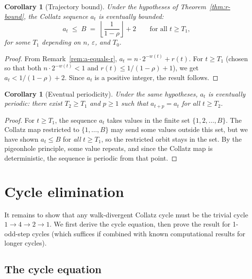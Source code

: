 \documentclass[11pt,a4paper]{article}
\theoremstyle{plain}
\newtheorem{corollary}[theorem]{Corollary}
\theoremstyle{definition}
\begin{document}
\begin{corollary}[Trajectory bound]\label{cor:bounded}
Under the hypotheses of Theorem~\ref{thm:r-bound}, the Collatz
sequence $a_t$ is eventually bounded:
\[
  a_t \;\le\; B \;=\; \left\lfloor \frac{1}{1-\rho} \right\rfloor + 2
  \qquad\text{for all } t \ge T_1,
\]
for some $T_1$ depending on $n$, $\varepsilon$, and $T_0$.
\end{corollary}

\begin{proof}
From Remark~\ref{rem:a-equals-r},
$a_t = n \cdot 2^{-w(t)} + r(t)$.  For $t \ge T_1$ (chosen so that
both $n \cdot 2^{-w(t)} < 1$ and $r(t) \le 1/(1-\rho) + 1$), we get
$a_t < 1/(1-\rho) + 2$.  Since $a_t$ is a positive integer, the
result follows.
\end{proof}

\begin{corollary}[Eventual periodicity]\label{cor:periodic}
Under the same hypotheses, $a_t$ is eventually periodic: there exist
$T_2 \ge T_1$ and $p \ge 1$ such that $a_{t+p} = a_t$ for all
$t \ge T_2$.
\end{corollary}

\begin{proof}
For $t \ge T_1$, the sequence $a_t$ takes values in the finite set
$\{1, 2, \ldots, B\}$.  The Collatz map restricted to $\{1, \ldots, B\}$
may send some values outside this set, but we have shown $a_t \le B$
for \emph{all} $t \ge T_1$, so the restricted orbit stays in the set.
By the pigeonhole principle, some value repeats, and since the Collatz
map is deterministic, the sequence is periodic from that point.
\end{proof}

\section{Cycle elimination}

It remains to show that any walk-divergent Collatz cycle must be the
trivial cycle $1 \to 4 \to 2 \to 1$.  We first derive the cycle
equation, then prove the result for 1-odd-step cycles (which suffices
if combined with known computational results for longer cycles).

\subsection{The cycle equation}
\end{document}
